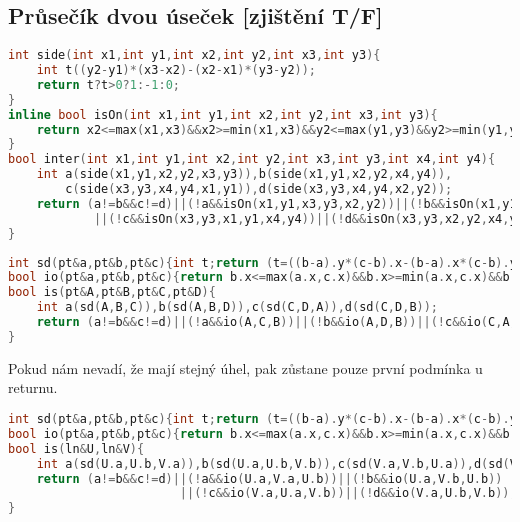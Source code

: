 \documentclass[11pt]{article}
\begin{document}
\subsection{Průsečík dvou úseček [zjištění T/F]}
\begin{lstlisting}[language=C++]
int side(int x1,int y1,int x2,int y2,int x3,int y3){
    int t((y2-y1)*(x3-x2)-(x2-x1)*(y3-y2));
    return t?t>0?1:-1:0;
}
inline bool isOn(int x1,int y1,int x2,int y2,int x3,int y3){
    return x2<=max(x1,x3)&&x2>=min(x1,x3)&&y2<=max(y1,y3)&&y2>=min(y1,y3);
}
bool inter(int x1,int y1,int x2,int y2,int x3,int y3,int x4,int y4){
    int a(side(x1,y1,x2,y2,x3,y3)),b(side(x1,y1,x2,y2,x4,y4)),
        c(side(x3,y3,x4,y4,x1,y1)),d(side(x3,y3,x4,y4,x2,y2));
    return (a!=b&&c!=d)||(!a&&isOn(x1,y1,x3,y3,x2,y2))||(!b&&isOn(x1,y1,x4,y4,x2,y2))
            ||(!c&&isOn(x3,y3,x1,y1,x4,y4))||(!d&&isOn(x3,y3,x2,y2,x4,y4));
}
\end{lstlisting}
\begin{lstlisting}[language=C++]
int sd(pt&a,pt&b,pt&c){int t;return (t=((b-a).y*(c-b).x-(b-a).x*(c-b).y))?t<0?-1:1:0;}
bool io(pt&a,pt&b,pt&c){return b.x<=max(a.x,c.x)&&b.x>=min(a.x,c.x)&&b.y<=max(a.y,c.y)&&b.y>=min(a.y,c.y);}
bool is(pt&A,pt&B,pt&C,pt&D){
    int a(sd(A,B,C)),b(sd(A,B,D)),c(sd(C,D,A)),d(sd(C,D,B));
    return (a!=b&&c!=d)||(!a&&io(A,C,B))||(!b&&io(A,D,B))||(!c&&io(C,A,D))||(!d&&io(C,B,D));
}
\end{lstlisting}
Pokud nám nevadí, že mají stejný úhel, pak zůstane pouze první podmínka u returnu.
\begin{lstlisting}[language=C++]
int sd(pt&a,pt&b,pt&c){int t;return (t=((b-a).y*(c-b).x-(b-a).x*(c-b).y))?t<0?-1:1:0;}
bool io(pt&a,pt&b,pt&c){return b.x<=max(a.x,c.x)&&b.x>=min(a.x,c.x)&&b.y<=max(a.y,c.y)&&b.y>=min(a.y,c.y);}
bool is(ln&U,ln&V){
    int a(sd(U.a,U.b,V.a)),b(sd(U.a,U.b,V.b)),c(sd(V.a,V.b,U.a)),d(sd(V.a,V.b,U.b));
    return (a!=b&&c!=d)||(!a&&io(U.a,V.a,U.b))||(!b&&io(U.a,V.b,U.b))
    					||(!c&&io(V.a,U.a,V.b))||(!d&&io(V.a,U.b,V.b));
}
\end{lstlisting}
\end{document}
